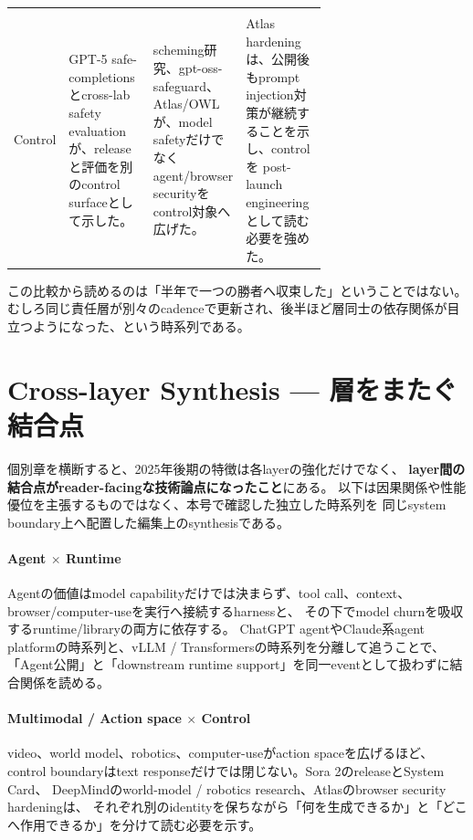 \begin{center}
\begin{tabularx}{\linewidth}{@{}p{0.14\linewidth}p{0.27\linewidth}p{0.27\linewidth}X@{}}
\cite{src-455a78bc36fa,src-ee0eb9562688,src-04b5c0f10b59} \\
Control &
GPT-5 safe-completionsとcross-lab safety evaluationが、releaseと評価を別のcontrol surfaceとして示した。
\cite{src-aec54e92a7f3,src-ad13fe7d3321} &
scheming研究、gpt-oss-safeguard、Atlas/OWLが、model safetyだけでなくagent/browser securityを
control対象へ広げた。 \cite{src-bef6cbe2a83e,src-2081c76ea2b4,src-240a05c02f85,src-3556c47e80db} &
Atlas hardeningは、公開後もprompt injection対策が継続することを示し、controlを
post-launch engineeringとして読む必要を強めた。 \cite{src-0ad9fbef8c87} \\
\bottomrule
\end{tabularx}
\renewcommand{\arraystretch}{1.0}
\end{center}
\normalsize

この比較から読めるのは「半年で一つの勝者へ収束した」ということではない。
むしろ同じ責任層が別々のcadenceで更新され、後半ほど層同士の依存関係が目立つようになった、という時系列である。

\Needspace{0.36\textheight}
\section{Cross-layer Synthesis — 層をまたぐ結合点}
\label{analysis:cross-layer}

個別章を横断すると、2025年後期の特徴は各layerの強化だけでなく、
\textbf{layer間の結合点がreader-facingな技術論点になったこと}にある。
以下は因果関係や性能優位を主張するものではなく、本号で確認した独立した時系列を
同じsystem boundary上へ配置した編集上のsynthesisである。

\paragraph{Agent $\times$ Runtime}
Agentの価値はmodel capabilityだけでは決まらず、tool call、context、browser/computer-useを実行へ接続するharnessと、
その下でmodel churnを吸収するruntime/libraryの両方に依存する。
ChatGPT agentやClaude系agent platformの時系列と、vLLM / Transformersの時系列を分離して追うことで、
「Agent公開」と「downstream runtime support」を同一eventとして扱わずに結合関係を読める。
\cite{src-b074ccdb2d9e,src-f6aa679babd7,src-43eaa2f12960,src-2595cdd4fabc}

\paragraph{Multimodal / Action space $\times$ Control}
video、world model、robotics、computer-useがaction spaceを広げるほど、
control boundaryはtext responseだけでは閉じない。Sora 2のreleaseとSystem Card、
DeepMindのworld-model / robotics research、Atlasのbrowser security hardeningは、
それぞれ別のidentityを保ちながら「何を生成できるか」と「どこへ作用できるか」を分けて読む必要を示す。
\cite{src-661a3476d3d5,src-8530f5b0e216,src-dd5d9b8662f3,src-0ad9fbef8c87}

